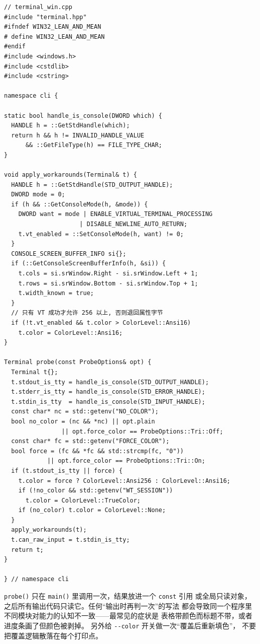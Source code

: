 \documentclass[12pt,a4paper,fontset=fandol]{ctexbook}
\newcommand{\Fn}[1]{\texttt{#1()}}
\newcommand{\Tp}[1]{\texttt{#1}}
\newcommand{\Opt}[1]{\texttt{-\/-#1}}
\begin{document}
\begin{lstlisting}[caption={Windows 分支的实现要点（terminal\_win.cpp）}]
// terminal_win.cpp
#include "terminal.hpp"
#ifndef WIN32_LEAN_AND_MEAN
# define WIN32_LEAN_AND_MEAN
#endif
#include <windows.h>
#include <cstdlib>
#include <cstring>

namespace cli {

static bool handle_is_console(DWORD which) {
  HANDLE h = ::GetStdHandle(which);
  return h && h != INVALID_HANDLE_VALUE
      && ::GetFileType(h) == FILE_TYPE_CHAR;
}

void apply_workarounds(Terminal& t) {
  HANDLE h = ::GetStdHandle(STD_OUTPUT_HANDLE);
  DWORD mode = 0;
  if (h && ::GetConsoleMode(h, &mode)) {
    DWORD want = mode | ENABLE_VIRTUAL_TERMINAL_PROCESSING
                     | DISABLE_NEWLINE_AUTO_RETURN;
    t.vt_enabled = ::SetConsoleMode(h, want) != 0;
  }
  CONSOLE_SCREEN_BUFFER_INFO si{};
  if (::GetConsoleScreenBufferInfo(h, &si)) {
    t.cols = si.srWindow.Right - si.srWindow.Left + 1;
    t.rows = si.srWindow.Bottom - si.srWindow.Top + 1;
    t.width_known = true;
  }
  // 只有 VT 成功才允许 256 以上, 否则退回属性字节
  if (!t.vt_enabled && t.color > ColorLevel::Ansi16)
    t.color = ColorLevel::Ansi16;
}

Terminal probe(const ProbeOptions& opt) {
  Terminal t{};
  t.stdout_is_tty = handle_is_console(STD_OUTPUT_HANDLE);
  t.stderr_is_tty = handle_is_console(STD_ERROR_HANDLE);
  t.stdin_is_tty  = handle_is_console(STD_INPUT_HANDLE);
  const char* nc = std::getenv("NO_COLOR");
  bool no_color = (nc && *nc) || opt.plain
                || opt.force_color == ProbeOptions::Tri::Off;
  const char* fc = std::getenv("FORCE_COLOR");
  bool force = (fc && *fc && std::strcmp(fc, "0"))
            || opt.force_color == ProbeOptions::Tri::On;
  if (t.stdout_is_tty || force) {
    t.color = force ? ColorLevel::Ansi256 : ColorLevel::Ansi16;
    if (!no_color && std::getenv("WT_SESSION"))
      t.color = ColorLevel::TrueColor;
    if (no_color) t.color = ColorLevel::None;
  }
  apply_workarounds(t);
  t.can_raw_input = t.stdin_is_tty;
  return t;
}

} // namespace cli
\end{lstlisting}

\begin{bestpractice}[title={把快照变成只读的全局单例}]
\Fn{probe} 只在 \Fn{main} 里调用一次，结果放进一个 \Tp{const} 引用
或全局只读对象，之后所有输出代码只读它。任何``输出时再判一次''的写法
都会导致同一个程序里不同模块对能力的认知不一致——最常见的症状是
表格带颜色而标题不带，或者进度条画了但颜色被剥掉。
另外给 \Opt{color} 开关做一次``覆盖后重新填色''，
不要把覆盖逻辑散落在每个打印点。
\end{bestpractice}
\end{document}
